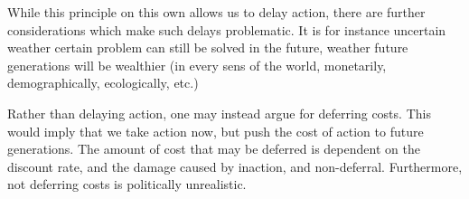 \documentclass[12pt]{report}
\begin{document}
While this principle on this own allows us to delay action, there are further
considerations which make such delays problematic. It is for instance uncertain
weather certain problem can still be solved in the future, weather future
generations will be wealthier (in every sens of the world, monetarily,
demographically, ecologically, etc.)

Rather than delaying action, one may instead argue for deferring costs. This
would imply that we take action now, but push the cost of action to future
generations. The amount of cost that may be deferred is dependent on the
discount rate, and the damage caused by inaction, and non-deferral. Furthermore,
not deferring costs is politically unrealistic.
\end{document}
